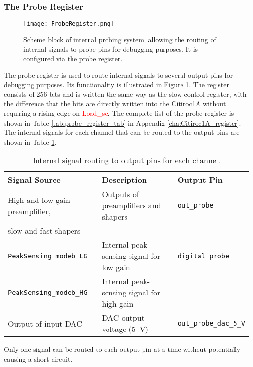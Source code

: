 \subsubsection{The Probe Register}\label{sec:probe_register}
\begin{figure}[H]
    \centering
    \texttt{[image: ProbeRegister.png]}
    \caption{Scheme block of internal probing system, allowing the routing of internal signals to probe pins for debugging purposes. It is configured via the probe register.\autocite{datasheetCITIROC}}
    \label{fig:CITIROC1A_proberegiseter}
\end{figure}
The probe register is used to route internal signals to several output pins for debugging purposes.
Its functionality is illustrated in Figure \ref{fig:CITIROC1A_proberegiseter}.
The register consists of 256 bits and is written the same way as the slow control register,
 with the difference that the bits are directly written into the Citiroc1A without requiring a rising edge on \textcolor{red}{Load\_sc}.\autocite{datasheetCITIROC}
\newline
 The complete list of the probe register is shown in Table \ref{tab:probe_register_tab} in Appendix \ref{cha:Citiroc1A_register}.
\newline
The internal signals for each channel that can be routed to the output pins are shown in Table \ref{tab:probe_register}. 
 \begin{table}[H]
    \centering
    \begin{tabular}{@{}lll@{}}
    \toprule
    \textbf{Signal Source} & \textbf{Description}                   & \textbf{Output Pin}        \\ \midrule
    High and low gain preamplifier, & Outputs of preamplifiers and shapers & \texttt{out\_probe}        \\
    slow and fast shapers                                                   &                          \\ \midrule
    \texttt{PeakSensing\_modeb\_LG} & Internal peak-sensing signal for low gain & \texttt{digital\_probe}    \\
    \texttt{PeakSensing\_modeb\_HG} & Internal peak-sensing signal for high gain & -    \\ \midrule
    Output of input DAC            & DAC output voltage (\SI{5}{\volt})  & \texttt{out\_probe\_dac\_5\_V} \\ \bottomrule
    \end{tabular}
    \caption{Internal signal routing to output pins for each channel.}
    \label{tab:probe_register}
\end{table}
Only one signal can be routed to each output pin at a time without potentially causing a short circuit.\autocite{datasheetCITIROC}
